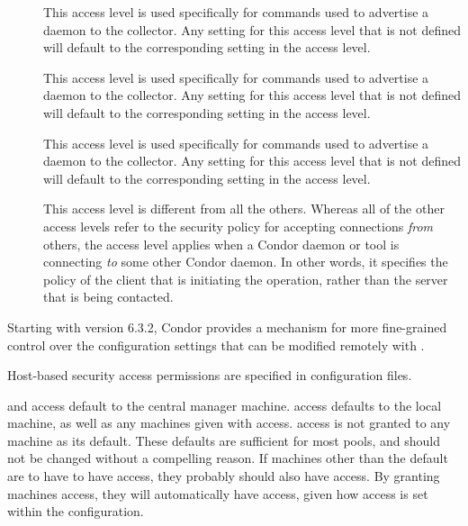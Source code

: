 \begin{description}
\item[] \label{dcperm:advertise-master} This
   access level is used specifically for commands used to advertise a
    daemon to the collector.  Any setting for this access
   level that is not defined will default to the corresponding setting
   in the  access level.

\item[] \label{dcperm:advertise-startd} This
   access level is used specifically for commands used to advertise a
    daemon to the collector.  Any setting for this access
   level that is not defined will default to the corresponding setting
   in the  access level.

\item[] \label{dcperm:advertise-schedd} This
   access level is used specifically for commands used to advertise a
    daemon to the collector.  Any setting for this access
   level that is not defined will default to the corresponding setting
   in the  access level.

\item[] \label{dcperm:client} This access level is
   different from all the others.  Whereas all of the other access levels
   refer to the security policy for accepting connections \emph{from} others,
   the  access level applies when a Condor daemon or tool is
   connecting \emph{to} some other Condor daemon.  In other words, it specifies
   the policy of the client that is initiating the operation, rather than
   the server that is being contacted.

\end{description}

Starting with version 6.3.2, Condor provides a mechanism for more
fine-grained control over the configuration settings that can be
modified remotely with .  

Host-based security access
permissions are specified in configuration files.

 and  access default to 
the central manager machine.
 access defaults to the local machine, as well as
any machines
given with  access.
 access is not granted to any machine
as its default.
These defaults are sufficient for most pools, and should not be changed without
a compelling reason.
If machines other than the default are to have to have 
access, they probably should also have  access.
By granting machines  access, they
will automatically have  access, given how
 access is set within the configuration.

